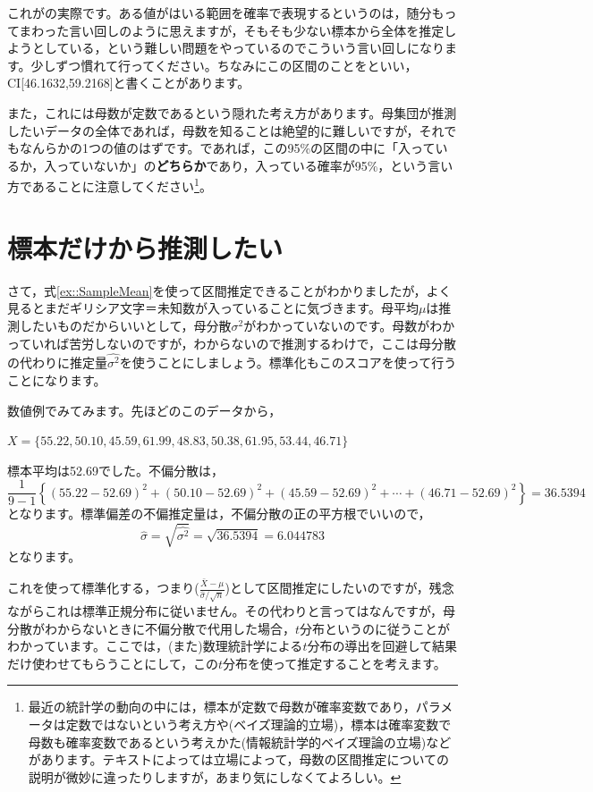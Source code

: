\documentclass{ltjsbook}
\begin{document}
これがの実際です。ある値がはいる範囲を確率で表現するというのは，随分もってまわった言い回しのように思えますが，そもそも少ない標本から全体を推定しようとしている，という難しい問題をやっているのでこういう言い回しになります。少しずつ慣れて行ってください。ちなみにこの区間のことをといい，CI[46.1632,59.2168]と書くことがあります。


また，これには母数が定数であるという隠れた考え方があります。母集団が推測したいデータの全体であれば，母数を知ることは絶望的に難しいですが，それでもなんらかの1つの値のはずです。であれば，この95\%の区間の中に「入っているか，入っていないか」の\textbf{どちらか}であり，入っている確率が95\%，という言い方であることに注意してください\footnote{最近の統計学の動向の中には，標本が定数で母数が確率変数であり，パラメータは定数ではないという考え方や(ベイズ理論的立場)，標本は確率変数で母数も確率変数であるという考えかた(情報統計学的ベイズ理論の立場)などがあります。テキストによっては立場によって，母数の区間推定についての説明が微妙に違ったりしますが，あまり気にしなくてよろしい。}。

\section{標本だけから推測したい}
さて，式\ref{ex::SampleMean}を使って区間推定できることがわかりましたが，よく見るとまだギリシア文字＝未知数が入っていることに気づきます。母平均$\mu$は推測したいものだからいいとして，母分散$\sigma^2$がわかっていないのです。母数がわかっていれば苦労しないのですが，わからないので推測するわけで，ここは母分散の代わりに推定量$\hat{\sigma^2}$を使うことにしましょう。標準化もこのスコアを使って行うことになります。

数値例でみてみます。先ほどのこのデータから，
\begin{tcolorbox}
    $X = \{ 55.22, 50.10, 45.59, 61.99, 48.83, 50.38, 61.95, 53.44, 46.71\}$
\end{tcolorbox}
標本平均は52.69でした。不偏分散は，
\[ \frac{1}{9-1}\left\{ (55.22-52.69)^2+(50.10-52.69)^2+(45.59-52.69)^2+\cdots+(46.71-52.69)^2 \right\}=36.5394\]
となります。標準偏差の不偏推定量は，不偏分散の正の平方根でいいので，
\[ \hat{\sigma}=\sqrt{\hat{\sigma^2}}= \sqrt{36.5394}=6.044783 \]
となります。

これを使って標準化する，つまり($\frac{\bar{X}-\mu}{\hat{\sigma}/\sqrt{n}}$)として区間推定にしたいのですが，残念ながらこれは標準正規分布に従いません。その代わりと言ってはなんですが，母分散がわからないときに不偏分散で代用した場合，$t$分布というのに従うことがわかっています。ここでは，(また)数理統計学による$t$分布の導出を回避して結果だけ使わせてもらうことにして，この$t$分布を使って推定することを考えます。
\end{document}
